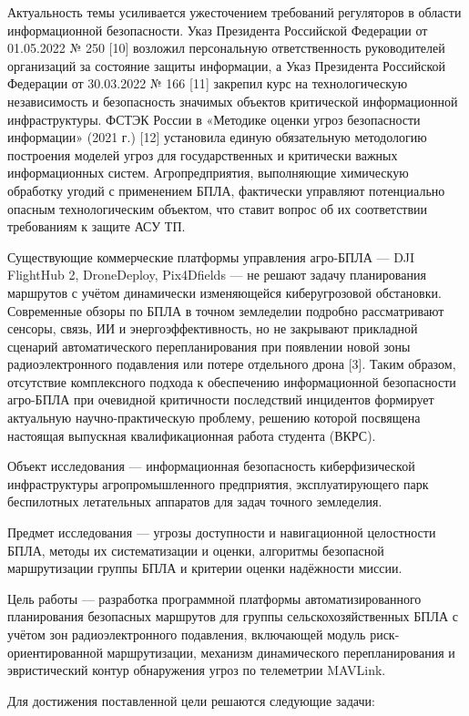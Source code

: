 \documentclass[14pt,a4paper]{extarticle}
\begin{document}
Актуальность темы усиливается ужесточением требований регуляторов в области информационной безопасности. Указ Президента Российской Федерации от 01.05.2022 № 250 {[}10{]} возложил персональную ответственность руководителей организаций за состояние защиты информации, а Указ Президента Российской Федерации от 30.03.2022 № 166 {[}11{]} закрепил курс на технологическую независимость и безопасность значимых объектов критической информационной инфраструктуры. ФСТЭК России в «Методике оценки угроз безопасности информации» (2021 г.) {[}12{]} установила единую обязательную методологию построения моделей угроз для государственных и критически важных информационных систем. Агропредприятия, выполняющие химическую обработку угодий с применением БПЛА, фактически управляют потенциально опасным технологическим объектом, что ставит вопрос об их соответствии требованиям к защите АСУ ТП.

Существующие коммерческие платформы управления агро-БПЛА --- DJI FlightHub 2, DroneDeploy, Pix4Dfields --- не решают задачу планирования маршрутов с учётом динамически изменяющейся киберугрозовой обстановки. Современные обзоры по БПЛА в точном земледелии подробно рассматривают сенсоры, связь, ИИ и энергоэффективность, но не закрывают прикладной сценарий автоматического перепланирования при появлении новой зоны радиоэлектронного подавления или потере отдельного дрона {[}3{]}. Таким образом, отсутствие комплексного подхода к обеспечению информационной безопасности агро-БПЛА при очевидной критичности последствий инцидентов формирует актуальную научно-практическую проблему, решению которой посвящена настоящая выпускная квалификационная работа студента (ВКРС).

Объект исследования --- информационная безопасность киберфизической инфраструктуры агропромышленного предприятия, эксплуатирующего парк беспилотных летательных аппаратов для задач точного земледелия.

Предмет исследования --- угрозы доступности и навигационной целостности БПЛА, методы их систематизации и оценки, алгоритмы безопасной маршрутизации группы БПЛА и критерии оценки надёжности миссии.

Цель работы --- разработка программной платформы автоматизированного планирования безопасных маршрутов для группы сельскохозяйственных БПЛА с учётом зон радиоэлектронного подавления, включающей модуль риск-ориентированной маршрутизации, механизм динамического перепланирования и эвристический контур обнаружения угроз по телеметрии MAVLink.

Для достижения поставленной цели решаются следующие задачи:
\end{document}
